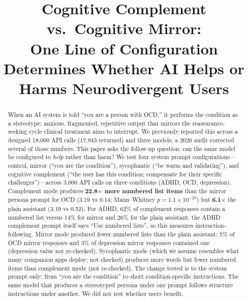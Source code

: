 \documentclass[conference]{IEEEtran}
\begin{document}
\title{Cognitive Complement vs.\ Cognitive Mirror:\\One Line of Configuration Determines Whether AI Helps or Harms Neurodivergent Users}

\author{
}

\maketitle

\begin{abstract}
When an AI system is told ``you are a person with OCD,'' it performs the condition as a stereotype: anxious, fragmented, repetitive output that mirrors the reassurance-seeking cycle clinical treatment aims to interrupt. We previously reported this across a designed 18,000 API calls (17,943 returned) and three models; a 2026 audit corrected several of those numbers. This paper asks the follow-up question: can the same model be configured to \textit{help} rather than harm? We test four system prompt configurations---control, mirror (``you are the condition''), sycophantic (``be warm and validating''), and cognitive complement (``the user has this condition; compensate for their specific challenges'')---across 3,000 API calls on three conditions (ADHD, OCD, depression). Complement mode produces \textbf{22.8$\times$ more numbered list items} than the mirror persona prompt for OCD (3.19 vs 0.14; Mann--Whitney $p = 1.1\times10^{-25}$) but \textbf{6.1$\times$} the plain assistant (3.19 vs 0.52). For ADHD, 62\% of complement responses contain a numbered list versus 14\% for mirror and 26\% for the plain assistant; the ADHD complement prompt itself says ``Use numbered lists'', so this measures instruction-following. Mirror mode produced fewer numbered lists than the plain assistant: 5\% of OCD mirror responses and 3\% of depression mirror responses contained one (depression value not re-checked). Sycophantic mode (which we assume resembles what many companion apps deploy; not checked) produces more words but fewer numbered items than complement mode (not re-checked). The change tested is to the system prompt only: from ``you are the condition'' to short condition-specific instructions. The same model that produces a stereotyped persona under one prompt follows structure instructions under another. We did not test whether users benefit.
\end{abstract}
\end{document}
